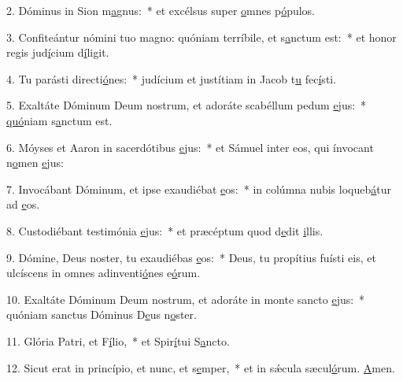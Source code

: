 2. Dóminus in Sion m\uline{a}gnus:~* et excélsus super \uline{o}mnes p\uline{ó}pulos.\par 
3. Confiteántur nómini tuo magno: quóniam terríbile, et s\uline{a}nctum est:~* et honor regis jud\uline{í}cium d\uline{í}ligit.\par 
4. Tu parásti directi\uline{ó}nes:~* judícium et justítiam in Jacob t\uline{u} fec\uline{í}sti.\par 
5. Exaltáte Dóminum Deum nostrum, et adoráte scabéllum pedum \uline{e}jus:~* \uline{quó}niam s\uline{a}nctum est.\par 
6. Móyses et Aaron in sacerdótibus \uline{e}jus:~* et Sámuel inter eos, qui ínvocant n\uline{o}men \uline{e}jus:\par 
7. Invocábant Dóminum, et ipse exaudiébat \uline{e}os:~* in colúmna nubis loqueb\uline{á}tur ad \uline{e}os.\par 
8. Custodiébant testimónia \uline{e}jus:~* et præcéptum quod d\uline{e}dit \uline{i}llis.\par 
9. Dómine, Deus noster, tu exaudiébas \uline{e}os:~* Deus, tu propítius fuísti eis, et ulcíscens in omnes adinventi\uline{ó}nes e\uline{ó}rum.\par 
10. Exaltáte Dóminum Deum nostrum, et adoráte in monte sancto \uline{e}jus:~* quóniam sanctus Dóminus D\uline{e}us n\uline{o}ster.\par 
11. Glória Patri, et F\uline{í}lio,~* et Spir\uline{í}tui S\uline{a}ncto.\par 
12. Sicut erat in princípio, et nunc, et s\uline{e}mper,~* et in sǽcula sæcul\uline{ó}rum. \uline{A}men.\par 
